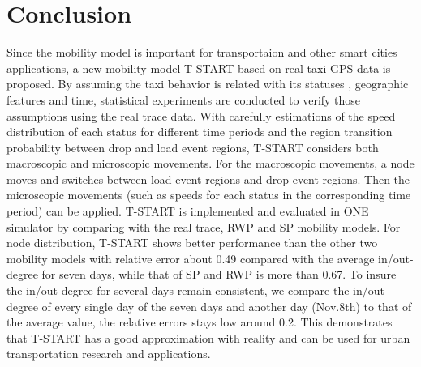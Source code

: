 \documentclass[10pt,journal,compsocconf,letterpaper]{IEEEtran}
\begin{document}








\section{Conclusion}
\label{section_conclusion}
Since the mobility model is important for transportaion and other smart cities applications, a new mobility model T-START based on real taxi GPS data is proposed. By assuming the taxi behavior is related with its statuses , geographic features and time, statistical experiments are conducted to verify those assumptions using the real trace data. With carefully estimations of the speed distribution of each status for different time periods and the region transition probability between drop and load event regions, T-START considers both macroscopic and microscopic movements. For the macroscopic movements, a node moves and switches between load-event regions and drop-event regions. Then the microscopic movements (such as speeds for each status in the corresponding time period) can be applied. T-START is implemented and evaluated in ONE simulator by comparing with the real trace, RWP and SP mobility models.
For node distribution, T-START shows better performance than the other two mobility models with relative error about 0.49 compared with the average in/out-degree for seven days, while that of SP and RWP is more than 0.67. To insure the in/out-degree for several days remain consistent, we compare the in/out-degree of every single day of the seven days and another day (Nov.8th) to that of the average value, the relative errors stays low around 0.2. This demonstrates that T-START has a good approximation with reality and can be used for urban transportation research and applications.


%
%
\end{document}
